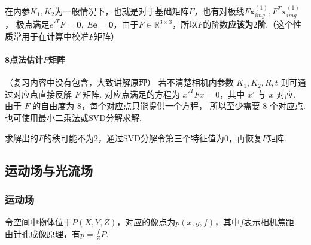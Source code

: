 \documentclass[12pt, a4paper, oneside]{ctexart}
\numberwithin{equation}{section}  %
\theoremstyle{definition}
\def\bd{\boldsymbol}        %
\def\R{\mathbb{R}}          %
\begin{document}
在内参$K_1,K_2$为一般情况下，也就是对于基础矩阵$F$，也有对极线$F\bd{x}^{(1)}_{img},F^T\bd{x}^{(1)}_{img}$，
极点满足$e'^TF = \bd{0},\ E\bd{e} = \bd{0}$，由于$F\in\R^{3\times 3}$，所以$F$的阶数\textbf{应该为$2$阶}.（这个性质常用于在计算中校准$F$矩阵）

\paragraph{8点法估计$F$矩阵}（复习内容中没有包含，大致讲解原理）
若不清楚相机内参数 $K_1,K_2,R,t$ 则可通过对应点直接反解 $F$ 矩阵. 
对应点满足的方程为 $x'^T F x = 0$，其中 $x'$ 与 $x$ 对应. 由于 $F$ 的自由度为 $8$，每个对应点只能提供一个方程，
所以至少需要 $8$ 个对应点. 也可使用最小二乘法或SVD分解求解.

求解出的$F$的秩可能不为$2$，通过SVD分解令第三个特征值为$0$，再恢复$F$矩阵.

\subsection{运动场与光流场}
\subsubsection{运动场}  %
令空间中物体位于$P(X,Y,Z)$，对应的像点为$p(x,y,f)$，其中$f$表示相机焦距. 由针孔成像原理，有$p = \frac{f}{Z}P$.
\end{document}
